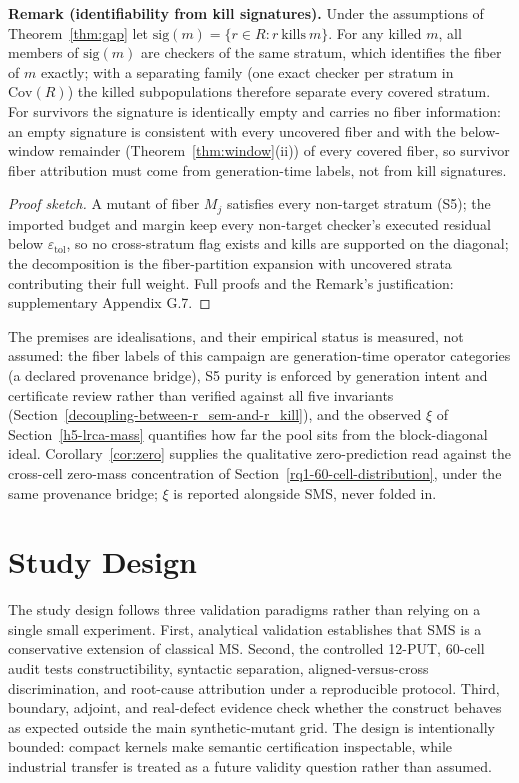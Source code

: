 \documentclass[manuscript,screen,review]{acmart}
\begin{document}
\textbf{Remark (identifiability from kill signatures).} Under the
assumptions of Theorem~\ref{thm:gap} let
$\mathrm{sig}(m) = \{r \in R : r\ \text{kills}\ m\}$. For any killed
$m$, all members of $\mathrm{sig}(m)$ are checkers of the same stratum,
which identifies the fiber of $m$ exactly; with a separating family (one
exact checker per stratum in $\mathrm{Cov}(R)$) the killed
subpopulations therefore separate every covered stratum. For survivors
the signature is identically empty and carries no fiber information: an
empty signature is consistent with every uncovered fiber and with the
below-window remainder (Theorem~\ref{thm:window}(ii)) of every covered
fiber, so survivor fiber attribution must come from generation-time
labels, not from kill signatures.

\begin{proof}[Proof sketch]
A mutant of fiber $M_j$ satisfies every non-target stratum (S5); the
imported budget and margin keep every non-target checker's executed
residual below $\varepsilon_{\mathrm{tol}}$, so no cross-stratum flag
exists and kills are supported on the diagonal; the decomposition is the
fiber-partition expansion with uncovered strata contributing their full
weight. Full proofs and the Remark's justification: supplementary
Appendix G.7.
\end{proof}

The premises are idealisations, and their empirical status is measured,
not assumed: the fiber labels of this campaign are generation-time
operator categories (a declared provenance bridge), S5 purity is
enforced by generation intent and certificate review rather than
verified against all five invariants
(Section~\ref{decoupling-between-r_sem-and-r_kill}), and the observed
$\xi$ of Section~\ref{h5-lrca-mass} quantifies how far the pool sits
from the block-diagonal ideal. Corollary~\ref{cor:zero} supplies the
qualitative zero-prediction read against the cross-cell zero-mass
concentration of Section~\ref{rq1-60-cell-distribution}, under the same
provenance bridge; $\xi$ is reported alongside SMS, never folded in.


\section{Study Design}\label{experimental-subjects-and-operator-framework}

The study design follows three validation paradigms rather than relying
on a single small experiment. First, analytical validation establishes
that SMS is a conservative extension of classical MS. Second, the
controlled 12-PUT, 60-cell audit tests constructibility, syntactic
separation, aligned-versus-cross discrimination, and root-cause
attribution under a reproducible protocol. Third, boundary, adjoint, and
real-defect evidence check whether the construct behaves as expected
outside the main synthetic-mutant grid. The design is intentionally
bounded: compact kernels make semantic certification inspectable, while
industrial transfer is treated as a future validity question rather than
assumed.
\end{document}
